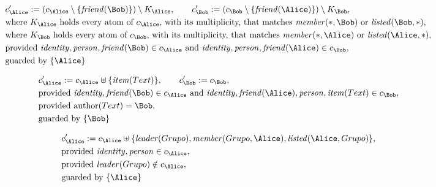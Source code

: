 \begin{align*}
&
c'_
{
\Alice
}
 := 
(c_
{
\Alice
}
 \setminus 
\{
\mathit{
friend
}
(
\Bob
)
\}
) \setminus K_
{
\Alice
}
, \qquad 
c'_
{
\Bob
}
 := 
(c_
{
\Bob
}
 \setminus 
\{
\mathit{
friend
}
(
\Alice
)
\}
) \setminus K_
{
\Bob
}
,\\
&
\text{where } K_
{
\Alice
}
 \text{ holds every atom of } c_
{
\Alice
}
 \text{, with its multiplicity, that matches } 
\mathit{
member
}
(
\ast
,
\Bob
)
 \text{ or } 
\mathit{
listed
}
(
\Bob
,
\ast
)
,\\
&
\text{where } K_
{
\Bob
}
 \text{ holds every atom of } c_
{
\Bob
}
 \text{, with its multiplicity, that matches } 
\mathit{
member
}
(
\ast
,
\Alice
)
 \text{ or } 
\mathit{
listed
}
(
\Alice
,
\ast
)
,\\
&
\text{provided } 
\mathit{
identity
}
,
\mathit{
person
}
,
\mathit{
friend
}
(
\Bob
)
 \in c_
{
\Alice
}
 \text{ and } 
\mathit{
identity
}
,
\mathit{
person
}
,
\mathit{
friend
}
(
\Alice
)
 \in c_
{
\Bob
}
,\\
&
\text{guarded by } \{
\Alice
\}
\end{align*}

\begin{align*}
&
c'_
{
\Alice
}
 := 
c_
{
\Alice
}
 \uplus 
\{
\mathit{
item
}
(
Text
)
\}
, \qquad 
c'_
{
\Bob
}
 := 
c_
{
\Bob
}
,\\
&
\text{provided } 
\mathit{
identity
}
,
\mathit{
friend
}
(
\Bob
)
 \in c_
{
\Alice
}
 \text{ and } 
\mathit{
identity
}
,
\mathit{
friend
}
(
\Alice
)
,
\mathit{
person
}
,
\mathit{
item
}
(
Text
)
 \in c_
{
\Bob
}
,\\
&
\text{provided } 
\mathrm{author}(
Text
)
=
\Bob
,\\
&
\text{guarded by } \{
\Bob
\}
\end{align*}

\begin{align*}
&
c'_
{
\Alice
}
 := 
c_
{
\Alice
}
 \uplus 
\{
\mathit{
leader
}
(
Grupo
)
,
\mathit{
member
}
(
Grupo
,
\Alice
)
,
\mathit{
listed
}
(
\Alice
,
Grupo
)
\}
,\\
&
\text{provided } 
\mathit{
identity
}
,
\mathit{
person
}
 \in c_
{
\Alice
}
,\\
&
\text{provided } 
\mathit{
leader
}
(
Grupo
)
 \notin c_
{
\Alice
}
,\\
&
\text{guarded by } \{
\Alice
\}
\end{align*}

